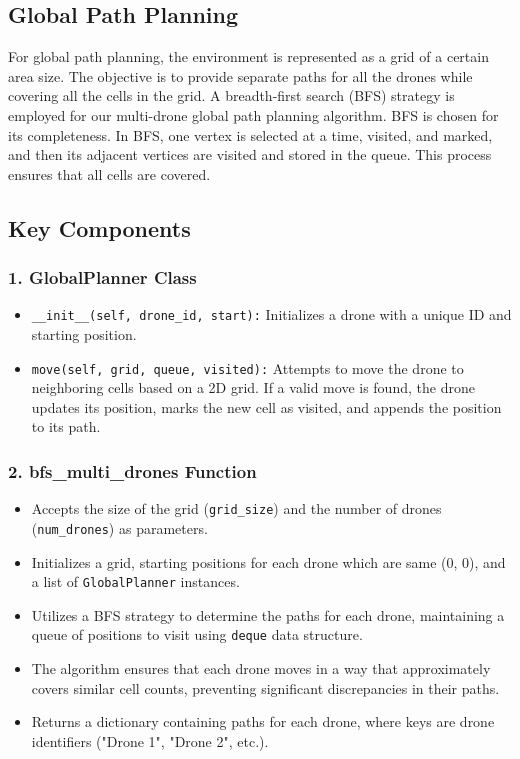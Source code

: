 \documentclass{article}
\begin{document}
\subsection*{Global Path Planning}

For global path planning, the environment is represented as a grid of a certain area size. The objective is to provide separate paths for all the drones while covering all the cells in the grid. A breadth-first search (BFS) strategy is employed for our multi-drone global path planning algorithm. BFS is chosen for its completeness. In BFS, one vertex is selected at a time, visited, and marked, and then its adjacent vertices are visited and stored in the queue. This process ensures that all cells are covered.

\subsection*{Key Components}

\subsubsection*{1. GlobalPlanner Class}

\begin{itemize}
    \item \texttt{\_\_init\_\_(self, drone\_id, start):} Initializes a drone with a unique ID and starting position.
    \item \texttt{move(self, grid, queue, visited):} Attempts to move the drone to neighboring cells based on a 2D grid. If a valid move is found, the drone updates its position, marks the new cell as visited, and appends the position to its path.
\end{itemize}

\subsubsection*{2. bfs\_multi\_drones Function}

\begin{itemize}
    \item Accepts the size of the grid (\texttt{grid\_size}) and the number of drones (\texttt{num\_drones}) as parameters.
    \item Initializes a grid, starting positions for each drone which are same (0, 0), and a list of \texttt{GlobalPlanner} instances.
    \item Utilizes a BFS strategy to determine the paths for each drone, maintaining a queue of positions to visit using \texttt{deque} data structure.
    \item The algorithm ensures that each drone moves in a way that approximately covers similar cell counts, preventing significant discrepancies in their paths.
    \item Returns a dictionary containing paths for each drone, where keys are drone identifiers ("Drone 1", "Drone 2", etc.).
\end{itemize}
\end{document}
